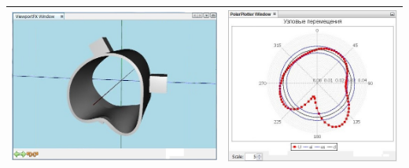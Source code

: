 \documentclass[14pt,oneside,final]{extreport}
\begin{document}
\begin{appendices}
\begin{table}[]
{{\begin{tabu}[]{|c|c|}
					\includegraphics[scale=0.55]{img/simulation-force-test-model3} & \includegraphics[scale=0.55]{img/simulation-force-test-graph3}  \\ 
					\hline
				\end{tabu}
			}
	}\end{table}


\end{appendices}
\end{document}
